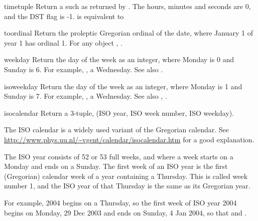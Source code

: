 \begin{methoddesc}{timetuple}{}
  Return a  such as returned by
  .  The hours, minutes and seconds are
  0, and the DST flag is -1.
   is equivalent to
\end{methoddesc}

\begin{methoddesc}{toordinal}{}
  Return the proleptic Gregorian ordinal of the date, where January 1
  of year 1 has ordinal 1.  For any  object ,
  .
\end{methoddesc}

\begin{methoddesc}{weekday}{}
  Return the day of the week as an integer, where Monday is 0 and
  Sunday is 6.  For example, , a
  Wednesday.
  See also .
\end{methoddesc}

\begin{methoddesc}{isoweekday}{}
  Return the day of the week as an integer, where Monday is 1 and
  Sunday is 7.  For example, , a
  Wednesday.
  See also , .
\end{methoddesc}

\begin{methoddesc}{isocalendar}{}
  Return a 3-tuple, (ISO year, ISO week number, ISO weekday).

  The ISO calendar is a widely used variant of the Gregorian calendar.
  See \url{http://www.phys.uu.nl/~vgent/calendar/isocalendar.htm}
  for a good explanation.

  The ISO year consists of 52 or 53 full weeks, and where a week starts
  on a Monday and ends on a Sunday.  The first week of an ISO year is
  the first (Gregorian) calendar week of a year containing a Thursday.
  This is called week number 1, and the ISO year of that Thursday is
  the same as its Gregorian year.

  For example, 2004 begins on a Thursday, so the first week of ISO
  year 2004 begins on Monday, 29 Dec 2003 and ends on Sunday, 4 Jan
  2004, so that
  and 
  .
\end{methoddesc}

